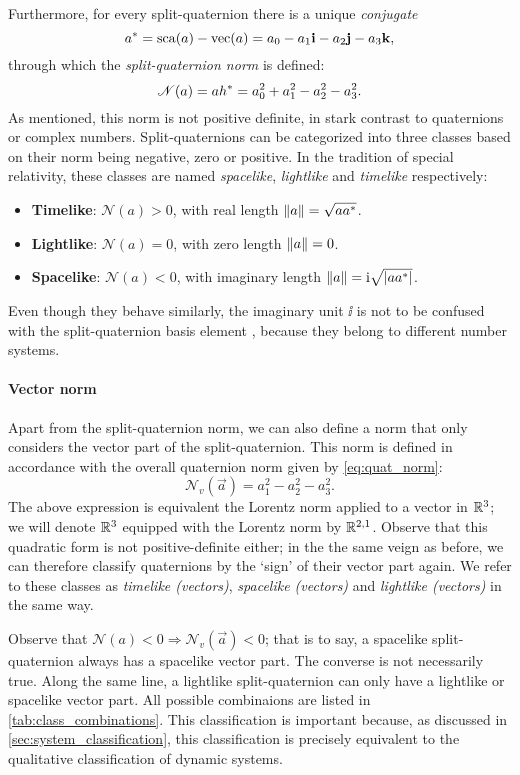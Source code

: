 Furthermore, for every split-quaternion there is a unique \emph{conjugate}
$$ a^* = \mathrm{sca}\qty(a) - \mathrm{vec}\qty(a) = a_0 - a_1\vb{i} - a_2\vb{j} - a_3\vb{k}, $$
through which the \emph{split-quaternion norm} is defined:
\begin{equation}
    \mathscr{N}(a) = ah^* = a_0^2 + a_1^2 - a_2^2 - a_3^2. 
    \label{eq:quat_norm}
\end{equation}
As mentioned, this norm is not positive definite, in stark contrast to quaternions or complex numbers. Split-quaternions can be categorized into three classes based on their norm being negative, zero or positive. In the tradition of special relativity, these classes are named \emph{spacelike}, \emph{lightlike} and \emph{timelike} respectively: \cite{Misner1970,Landau1971}
\begin{itemize}
    \item \textbf{Timelike}: $ \mathscr{N}(a) > 0 $, with real length $ \norm{a} = \sqrt{a a^*}$. 
    \item \textbf{Lightlike}: $ \mathscr{N}(a) = 0 $, with zero length $\norm{a} = 0$. 
    \item \textbf{Spacelike}: $ \mathscr{N}(a) < 0 $, with imaginary length $\norm{a} = \mathrm{i} \sqrt{\abs{aa^*}}$.
\end{itemize}
Even though they behave similarly, the imaginary unit $\ii$ is not to be confused with the split-quaternion basis element \quati, because they belong to different number systems.

\paragraph{Vector norm}
Apart from the split-quaternion norm, we can also define a norm that only considers the vector part of the split-quaternion. This norm is defined in accordance with the overall quaternion norm given by \cref{eq:quat_norm}:
$$ \mathscr{N}_v(\vec{a}) = a_1^2 - a^2_2 - a^2_3. $$
The above expression is equivalent the Lorentz norm applied to a vector in $\mathbb{R}^3$; we will denote $\mathbb{R}^3$ equipped with the Lorentz norm by $\mathbb{R}^{2, 1}$. \cite{Jafari2014} Observe that this quadratic form is not positive-definite either; in the the same veign as before, we can therefore classify quaternions by the `sign' of their vector part again. We refer to these classes as \emph{timelike (vectors)}, \emph{spacelike (vectors)} and \emph{lightlike (vectors)} in the same way. 

Observe that $ \mathscr{N}(a) < 0 \Rightarrow \mathscr{N}_v(\vec{a}) < 0$; that is to say, a spacelike split-quaternion always has a spacelike vector part. The converse is not necessarily true. Along the same line, a lightlike split-quaternion can only have a lightlike or spacelike vector part. All possible combinaions are listed in \cref{tab:class_combinations}. This classification is important because, as discussed in \cref{sec:system_classification}, this classification is precisely equivalent to the qualitative classification of dynamic systems.

